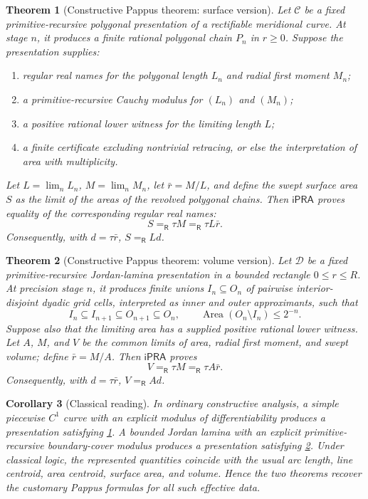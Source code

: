 \documentclass[11pt]{article}
\newtheorem{theorem}{Theorem}[section]
\newtheorem{corollary}[theorem]{Corollary}
\theoremstyle{definition}
\newcommand{\ipra}{\mathsf{iPRA}}
\newcommand{\Eq}{\mathrel{=_{\!\mathsf R}}}
\newcommand{\Area}{\operatorname{Area}}
\begin{document}
\begin{theorem}[Constructive Pappus theorem: surface version]
\label{thm:surface-main}
Let \(\mathcal C\) be a fixed primitive-recursive polygonal presentation of a
rectifiable meridional curve.  At stage \(n\), it produces a finite rational
polygonal chain \(P_n\) in \(r\geq0\).  Suppose the presentation supplies:
\begin{enumerate}[label=(\roman*),leftmargin=2.3em]
\item regular real names for the polygonal length \(L_n\) and radial first
moment \(M_n\);
\item a primitive-recursive Cauchy modulus for \((L_n)\) and \((M_n)\);
\item a positive rational lower witness for the limiting length \(L\);
\item a finite certificate excluding nontrivial retracing, or else the
interpretation of area with multiplicity.
\end{enumerate}
Let \(L=\lim_nL_n\), \(M=\lim_nM_n\), let
\(\bar r=M/L\), and define the swept surface area \(S\) as the limit of the
areas of the revolved polygonal chains.  Then \(\ipra\) proves equality of the
corresponding regular real names:
\[
  S\Eq \tau M\Eq \tau L\bar r.
\]
Consequently, with \(d=\tau\bar r\), \(S\Eq Ld\).
\end{theorem}

\begin{theorem}[Constructive Pappus theorem: volume version]
\label{thm:volume-main}
Let \(\mathcal D\) be a fixed primitive-recursive Jordan-lamina presentation
in a bounded rectangle \(0\leq r\leq R\).  At precision stage \(n\), it
produces finite unions \(I_n\subseteq O_n\) of pairwise interior-disjoint
dyadic grid cells, interpreted as inner and outer approximants, such that
\[
 I_n\subseteq I_{n+1}\subseteq O_{n+1}\subseteq O_n,
 \qquad
 \Area(O_n\setminus I_n)\leq2^{-n}.
\]
Suppose also that the limiting area has a supplied positive rational lower
witness.  Let \(A\), \(M\), and \(V\) be the common limits of area, radial
first moment, and swept volume; define \(\bar r=M/A\).  Then \(\ipra\) proves
\[
  V\Eq \tau M\Eq \tau A\bar r.
\]
Consequently, with \(d=\tau\bar r\), \(V\Eq Ad\).
\end{theorem}

\begin{corollary}[Classical reading]
\label{cor:classical-reading}
In ordinary constructive analysis, a simple piecewise \(C^1\) curve with an
explicit modulus of differentiability produces a presentation satisfying
\cref{thm:surface-main}.  A bounded Jordan lamina with an explicit
primitive-recursive boundary-cover modulus produces a presentation satisfying
\cref{thm:volume-main}.  Under classical logic, the represented quantities
coincide with the usual arc length, line centroid, area centroid, surface area,
and volume.  Hence the two theorems recover the customary Pappus formulas for
all such effective data.
\end{corollary}
\end{document}
